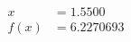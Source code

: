 \documentclass[preview]{standalone}
\begin{document}
\begin{align*}
x &= 1.5500\\f(x) &= 6.2270693
\end{align*}
\end{document}
